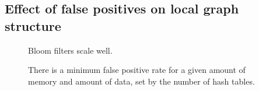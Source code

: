 \documentclass[12pt]{article} \usepackage{simplemargins}
\begin{document}
\subsection{Effect of false positives on local graph structure}


\begin{figure}
\caption{Bloom filters scale well.}
\end{figure}

\begin{figure}
\caption{There is a minimum false positive rate for a given amount of memory
and amount of data, set by the number of hash tables.}
\end{figure}
\end{document}
